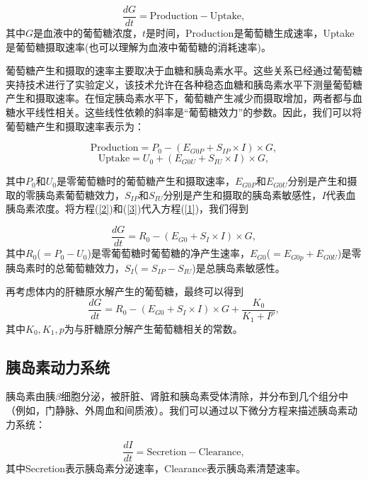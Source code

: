 \begin{equation}\label{1}
    \frac{dG}{dt} = \text{Production} - \text{Uptake},
\end{equation}
其中$G$是血液中的葡萄糖浓度，$t$是时间，Production是葡萄糖生成速率，Uptake是葡萄糖摄取速率(也可以理解为血液中葡萄糖的消耗速率)。

葡萄糖产生和摄取的速率主要取决于血糖和胰岛素水平。这些关系已经通过葡萄糖夹持技术进行了实验定义，该技术允许在各种稳态血糖和胰岛素水平下测量葡萄糖产生和摄取速率\cite{bergman1985assessment}。在恒定胰岛素水平下，葡萄糖产生减少而摄取增加，两者都与血糖水平线性相关\cite{best1981glucose}。这些线性依赖的斜率是“葡萄糖效力”的参数。因此，我们可以将葡萄糖产生和摄取速率表示为：

\begin{equation}\label{2}
    \text{Production} = P_0 -(E_{G0P} + S_{IP} \times I) \times G,
\end{equation}
\begin{equation}\label{3}
    \text{Uptake} = U_0 + (E_{G0U} + S_{IU} \times I) \times G,
\end{equation}

其中$P_0$和$U_0$是零葡萄糖时的葡萄糖产生和摄取速率，\(E_{G0P}\)和\(E_{G0U}\)分别是产生和摄取的零胰岛素葡萄糖效力，\(S_{IP}\)和\(S_{IU}\)分别是产生和摄取的胰岛素敏感性，$I$代表血胰岛素浓度。将方程(\ref{2})和(\ref{3})代入方程(\ref{1})，我们得到

\begin{equation}
    \frac{dG}{dt} = R_0 -(E_{G0} + S_I \times I) \times G,
\end{equation}
其中$R_0$($=P_0-U_0$)是零葡萄糖时葡萄糖的净产生速率，\(E_{G0}\)($=E_{G0p}+E_{G0U}$)是零胰岛素时的总葡萄糖效力，\(S_I\)($=S_{IP}-S_{IU}$)是总胰岛素敏感性\cite{topp2000model}。

再考虑体内的肝糖原水解产生的葡萄糖，最终可以得到
\begin{equation}
    \frac{dG}{dt} = R_0 -(E_{G0} + S_I \times I) \times G+\frac{K_0}{K_1+I^p},
\end{equation}
其中$K_0,K_1,p$为与肝糖原分解产生葡萄糖相关的常数\cite{bridgewater2020amplitude}。
\subsection{胰岛素动力系统}
胰岛素由胰$\beta$细胞分泌，被肝脏、肾脏和胰岛素受体清除，并分布到几个组分中（例如，门静脉、外周血和间质液）。我们可以通过以下微分方程来描述胰岛素动力系统：

\begin{equation}\label{4}
\frac{dI}{dt} = \text{Secretion} - \text{Clearance},
\end{equation}
其中Secretion表示胰岛素分泌速率，Clearance表示胰岛素清楚速率。

